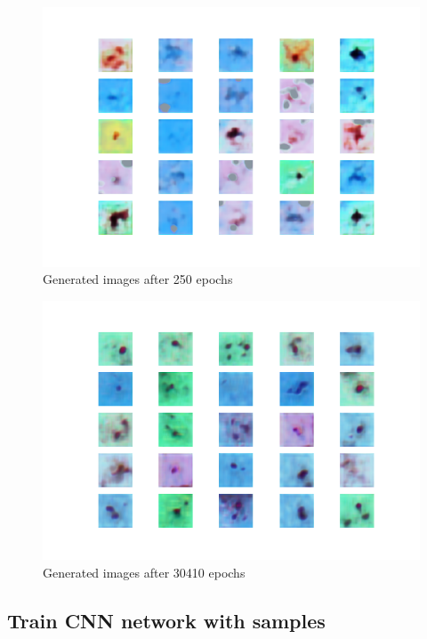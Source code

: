 \begin{figure}[h]
\caption{Generated images after 250 epochs}
\label{fig:gen250}
\begin{center}
\includegraphics[scale=0.45]{./images/generation/alta_mnist_250.png} \end{center}
\end{figure}

\begin{figure}[h]
\caption{Generated images after 30410 epochs}
\label{fig:gen30410}
\begin{center}
\includegraphics[scale=0.45]{./images/generation/alta_mnist_30410.png} \end{center}
\end{figure}

\subsection{Train CNN network with samples}



